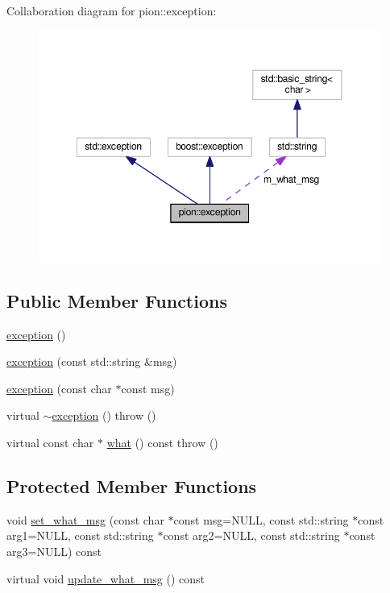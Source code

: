 Collaboration diagram for pion\-:\-:exception\-:
\nopagebreak
\begin{figure}[H]
\begin{center}
\leavevmode
\includegraphics[width=350pt]{classpion_1_1exception__coll__graph}
\end{center}
\end{figure}
\subsection*{Public Member Functions}
\begin{DoxyCompactItemize}
\item 
\hyperlink{classpion_1_1exception_a031f13a415ee022db9f14fea59eb5c74}{exception} ()
\item 
\hyperlink{classpion_1_1exception_aaec2c298dcad795cf4b66c18c440dfcb}{exception} (const std\-::string \&msg)
\item 
\hyperlink{classpion_1_1exception_a970d4da1afade252a5024dec90aa48d7}{exception} (const char $\ast$const msg)
\item 
virtual \hyperlink{classpion_1_1exception_aebcf314a4a7e4e7636ee25eb4a393d5c}{$\sim$exception} ()  throw ()
\item 
virtual const char $\ast$ \hyperlink{classpion_1_1exception_a40a62768258b7772de35398177dbd6ce}{what} () const   throw ()
\end{DoxyCompactItemize}
\subsection*{Protected Member Functions}
\begin{DoxyCompactItemize}
\item 
void \hyperlink{classpion_1_1exception_ab7aa00d924b61114cd98a96ec8a78a98}{set\-\_\-what\-\_\-msg} (const char $\ast$const msg=N\-U\-L\-L, const std\-::string $\ast$const arg1=N\-U\-L\-L, const std\-::string $\ast$const arg2=N\-U\-L\-L, const std\-::string $\ast$const arg3=N\-U\-L\-L) const 
\item 
virtual void \hyperlink{classpion_1_1exception_a13a7f06c1c25bfa139447f5ac091f85f}{update\-\_\-what\-\_\-msg} () const 
\end{DoxyCompactItemize}
